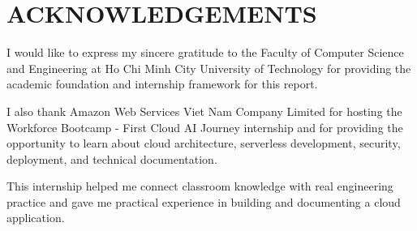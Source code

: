 \chapter*{ACKNOWLEDGEMENTS}

I would like to express my sincere gratitude to the Faculty of Computer
Science and Engineering at Ho Chi Minh City University of Technology for
providing the academic foundation and internship framework for this report.

I also thank Amazon Web Services Viet Nam Company Limited for hosting the
Workforce Bootcamp - First Cloud AI Journey internship and for providing the
opportunity to learn about cloud architecture, serverless development,
security, deployment, and technical documentation.

This internship helped me connect classroom knowledge with real engineering
practice and gave me practical experience in building and documenting a cloud
application.
\clearpage